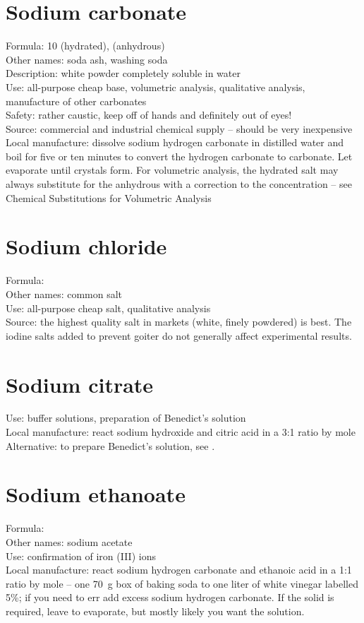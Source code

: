 \section{Sodium carbonate}
Formula:  10 (hydrated), 
 (anhydrous)\\
Other names: soda ash, washing soda\\
Description: white powder completely soluble in water\\
Use: all-purpose cheap base, 
volumetric analysis, 
qualitative analysis, 
manufacture of other carbonates\\
Safety: rather caustic, keep off of hands and definitely out of eyes!\\
Source: commercial and industrial chemical supply -- 
should be very inexpensive\\
Local manufacture: dissolve sodium hydrogen carbonate in distilled water 
and boil for five or ten minutes 
to convert the hydrogen carbonate to carbonate. 
Let evaporate until crystals form. 
For volumetric analysis, 
the hydrated salt may always substitute 
for the anhydrous with a correction to the concentration -- 
see Chemical Substitutions for Volumetric Analysis

\section{Sodium chloride}
Formula: \\
Other names: common salt\\
Use: all-purpose cheap salt, 
qualitative analysis\\
Source: the highest quality salt in markets (white, 
finely powdered) is best. 
The iodine salts added to prevent goiter 
do not generally affect experimental results.

\section{Sodium citrate}
Use: buffer solutions, 
preparation of Benedict's solution\\
Local manufacture: react sodium hydroxide 
and citric acid in a 3:1 ratio by mole\\
Alternative: to prepare Benedict's solution, 
see .

\section{Sodium ethanoate}
\label{sec:sodiumeth}
Formula: \\
Other names: sodium acetate\\
Use: confirmation of iron (III) ions\\
Local manufacture: react sodium hydrogen carbonate 
and ethanoic acid in a 1:1 ratio by mole -- 
one 70~g box of baking soda to one liter of white vinegar labelled 5\%; 
if you need to err add excess sodium hydrogen carbonate. 
If the solid is required, 
leave to evaporate, 
but mostly likely you want the solution.

